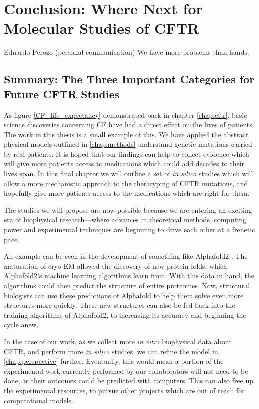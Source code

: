 \chapter{Conclusion: Where Next for Molecular Studies of CFTR}
\label{chap:conclusion}
\begin{chapquote} {Eduardo Perozo (personal communication)}
We have more problems than hands. 
\end{chapquote}


\section{Summary: The Three Important Categories for Future CFTR Studies}

As figure \ref{CF_life_expectancy} demonstrated back in chapter \ref{chap:cftr}, basic science discoveries concerning CF have had a direct effect on the lives of patients. The work in this thesis is a small example of this. We have applied the abstract physical models outlined in \ref{chap:methods} understand genetic mutations carried by real patients. It is hoped that our findings can help to collect evidence which will give more patients access to medications which could add decades to their lives span. In this final chapter we will outline a set of \textit{in silico} studies which will allow a more mechanistic approach to the theratyping of CFTR mutations, and hopefully give more patients access to the medications which are right for them.  

The studies we will propose are now possible because we are entering an exciting era of biophysical research---where advances in theoretical methods, computing power and experimental techniques are beginning to drive each other at a frenetic pace. 

An example can be seen in the development of something like Alphafold2 \cite{jumper2021}. The maturation of cryo-EM allowed the discovery of new protein folds, which Alphafold2's machine learning algorithms learn from. With this data in hand, the algorithms could then predict the structure of entire proteomes. Now, structural biologists can use these predictions of Alphafold to help them solve even more structures more quickly. These new structures can also be fed back into the training algorithms of Alphafold2, to increasing its accuracy and beginning the cycle anew. 

In the case of our work, as we collect more \textit{in vitro} biophysical data about CFTR, and perform more \textit{in silico} studies, we can refine the model in \ref{chap:perspective} further. Eventually, this would mean a portion of the experimental work currently performed by our collaborators will not need to be done, as their outcomes could be predicted with computers. This can also free up the experimental resources, to pursue other projects which are out of reach for computational models. 

